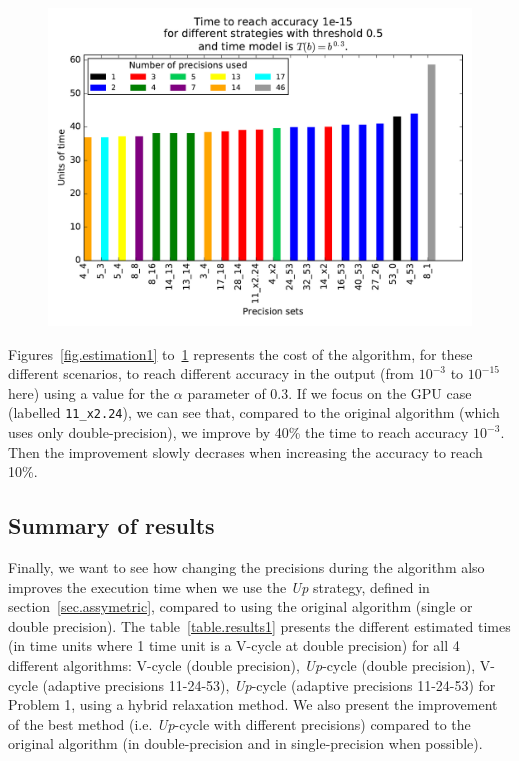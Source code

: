 \documentclass[sigplan]{acmart}
\begin{document}
   \begin{figure}
    \includegraphics[width=\linewidth]{figs/cost_15.pdf}
    \caption{}
    \label{fig.estimation5}
   \end{figure}
   
   Figures~\ref{fig.estimation1} to~\ref{fig.estimation5} represents the cost of the algorithm, for these different scenarios, to reach different accuracy in the output (from $10^{-3}$ to $10^{-15}$ here) using
   a value for the $\alpha$ parameter of 0.3.
   If we focus on the GPU case (labelled \texttt{11\_x2.24}), we can see that, compared to the original algorithm (which uses only double-precision), we improve by 40\% the time to reach 
   accuracy $10^{-3}$. Then the improvement slowly decrases when increasing the accuracy to reach 10\%.
   
   \subsection{Summary of results}
   
   Finally, we want to see how changing the precisions during the algorithm also improves the execution time when we use the \emph{Up} strategy, defined in section~\ref{sec.assymetric}, compared to using the original algorithm (single or double precision).
   The table~\ref{table.results1} presents the different estimated times (in time units where 1 time unit is a V-cycle at double precision)
   for all 4 different algorithms: V-cycle (double precision), \emph{Up}-cycle (double precision), V-cycle (adaptive precisions 11-24-53), \emph{Up}-cycle (adaptive precisions 11-24-53) for Problem 1, using a hybrid relaxation method.
   We also present the improvement of the best method (i.e. \emph{Up}-cycle with different precisions) compared to the original algorithm (in double-precision and in single-precision when possible).
  
\end{document}
